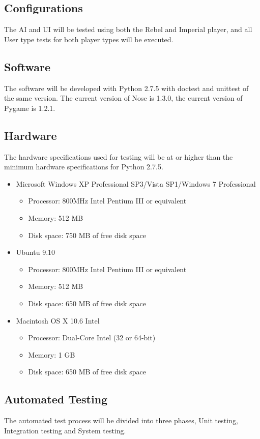 \documentclass[report]{article}
\begin{document}
\subsection{Configurations}
The AI and UI will be tested using both the Rebel and Imperial player, and all User type tests for both player types will be executed.

\subsection{Software}
The software will be developed with Python 2.7.5 with doctest and unittest of the same version. The current version of Nose is 1.3.0, the current version of Pygame is 1.2.1.

\subsection{Hardware}
The hardware specifications used for testing will be at or higher than the minimum hardware specifications for Python 2.7.5.

\begin{itemize}
\item Microsoft Windows XP Professional SP3/Vista SP1/Windows 7 Professional
\begin{itemize}
	\item Processor: 800MHz Intel Pentium III or equivalent
	\item Memory: 512 MB
	\item Disk space: 750 MB of free disk space
\end{itemize}
\item Ubuntu 9.10
\begin{itemize}
	\item Processor: 800MHz Intel Pentium III or equivalent
	\item Memory: 512 MB
	\item Disk space: 650 MB of free disk space
\end{itemize}
\item Macintosh OS X 10.6 Intel
\begin{itemize}
	\item Processor: Dual-Core Intel (32 or 64-bit)
	\item Memory: 1 GB
	\item Disk space: 650 MB of free disk space
\end{itemize}
\end{itemize}
\subsection{Automated Testing}
The automated test process will be divided into three phases, Unit testing, Integration testing and System testing.
\end{document}
